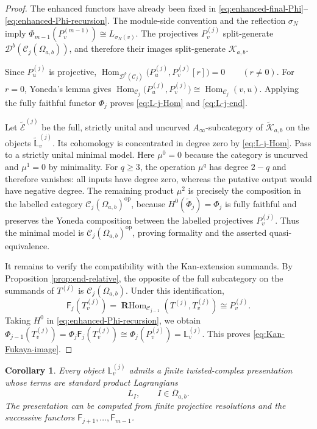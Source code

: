 \documentclass[12pt,a4paper,english,reqno]{amsart}
\theoremstyle{plain}
\newtheorem{corollary}[theorem]{Corollary}
\theoremstyle{definition}
\newcommand{\Hom}{\operatorname{Hom}}
\newcommand{\RHom}{\operatorname{\mathbf{R}Hom}}
\newcommand{\op}{\mathrm{op}}
\newcommand{\C}{\mathcal C}
\newcommand{\Db}[1]{{\mathscr D}^b(#1)}
\begin{document}
\begin{proof}
The enhanced functors have already been fixed in
\eqref{eq:enhanced-final-Phi}--\eqref{eq:enhanced-Phi-recursion}.  The
module-side convention and the reflection $\sigma_N$ imply $\Phi_{m-1}(P_v^{(m-1)})
 \cong L_{\sigma_N(v)}$.
The projectives $P_v^{(j)}$ split-generate
$\Db{\C_j(\Omega_{a,b})}$, and therefore their images split-generate
$\mathcal K_{a,b}$.

Since $P_u^{(j)}$ is projective,
$\Hom_{\Db{\C_j}}
 \bigl(P_u^{(j)},P_v^{(j)}[r]\bigr)=0
 \qquad(r\neq0)$.
For $r=0$, Yoneda's lemma gives $
 \Hom_{\C_j}
 \bigl(P_u^{(j)},P_v^{(j)}\bigr)
 \cong
 \Hom_{\C_j}(v,u)$.
Applying the fully faithful functor $\Phi_j$ proves
\eqref{eq:L-j-Hom} and \eqref{eq:L-j-end}.

Let $\widetilde{\mathcal E}^{(j)}$ be the full, strictly unital and
uncurved $A_\infty$-subcategory of $\widetilde{\mathcal K}_{a,b}$ on the
objects $\widetilde{\mathbb L}_v^{(j)}$.  Its cohomology is concentrated in
degree zero by \eqref{eq:L-j-Hom}.  Pass to a strictly unital minimal model.
Here $\mu^0=0$ because the category is uncurved and $\mu^1=0$ by
minimality.  For $q\geq3$, the operation $\mu^q$ has degree $2-q$ and
therefore vanishes: all inputs have degree zero, whereas the putative output
would have negative degree.  The remaining product $\mu^2$ is precisely the
composition in the labelled category $\C_j(\Omega_{a,b})^{\op}$, because
$H^0(\widetilde\Phi_j)=\Phi_j$ is fully faithful and preserves the Yoneda
composition between the labelled projectives $P_v^{(j)}$.  Thus the minimal
model is $\C_j(\Omega_{a,b})^{\op}$, proving formality and the asserted
quasi-equivalence.

It remains to verify the compatibility with the Kan-extension summands.
By Proposition \ref{prop:end-relative}, the opposite of the full subcategory
on the summands of $T^{(j)}$ is $\C_j(\Omega_{a,b})$.  Under this
identification,
\begin{equation}
 \mathsf F_j(T_v^{(j)})
 =
 \RHom_{\C_{j-1}}(T^{(j)},T_v^{(j)})
 \cong
 P_v^{(j)}.
\label{eq:Fj-Tv}
\end{equation}
Taking $H^0$ in \eqref{eq:enhanced-Phi-recursion}, we obtain $\Phi_{j-1}(T_v^{(j)})=
 \Phi_j\mathsf F_j(T_v^{(j)})
 \cong
 \Phi_j(P_v^{(j)})
 =\mathbb L_v^{(j)}$.
This proves \eqref{eq:Kan-Fukaya-image}.
\end{proof}

\begin{corollary}
\label{cor:twisted-complex-staircase}
Every object $\mathbb L_v^{(j)}$ admits a finite twisted-complex
presentation whose terms are standard product Lagrangians
\[
 L_I,\qquad I\in\overline\Omega_{a,b}.
\]
The presentation can be computed from finite projective resolutions and the
successive functors $\mathsf F_{j+1},\ldots,\mathsf F_{m-1}$.
\end{corollary}
\end{document}

